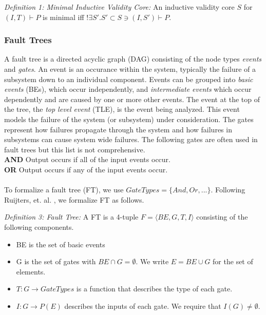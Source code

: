 \textit{Definition 1: Minimal Inductive Validity Core:} An inductive validity core $S$ for $(I,T) \vdash P$ is minimal iff $! \exists S' . S' \subset S \ni (I,S') \vdash P$. \\

\subsubsection{Fault Trees}
A fault tree is a directed acyclic graph (DAG) consisting of the node types \textit{events} and \textit{gates}. An event is an occurance within the system, typically the failure of a subsystem down to an individual component. Events can be grouped into \textit{basic events} (BEs), which occur independently, and \textit{intermediate events} which occur dependently and are caused by one or more other events. The event at the top of the tree, the \textit{top level event} (TLE), is the event being analyzed. This event models the failure of the system (or subsystem) under consideration. The gates represent how failures propagate through the system and how failures in subsystems can cause system wide failures. The following gates are often used in fault trees but this list is not comprehensive. \\
\textbf{AND} Output occurs if all of the input events occur.\\
\textbf{OR} Output occurs if any of the input events occur.\\

\\

To formalize a fault tree (FT), we use $GateTypes = \{And, Or, ...\}$. Following Ruijters, et. al. \cite{RuijtersSurvey}, we formalize FT as follows. 

\textit{Definition 3: Fault Tree:} A FT is a 4-tuple $F = \langle BE, G, T, I \rangle$ consisting of the following components. 
\begin{itemize}
\item BE is the set of basic events
\item G is the set of gates with $BE \cap G = \emptyset$. We write $E = BE \cup G$ for the set of elements.
\item $T: G \to GateTypes$ is a function that describes the type of each gate.
\item $I: G \to P(E)$ describes the inputs of each gate. We require that $I(G) \neq \emptyset$.
\end{itemize}

